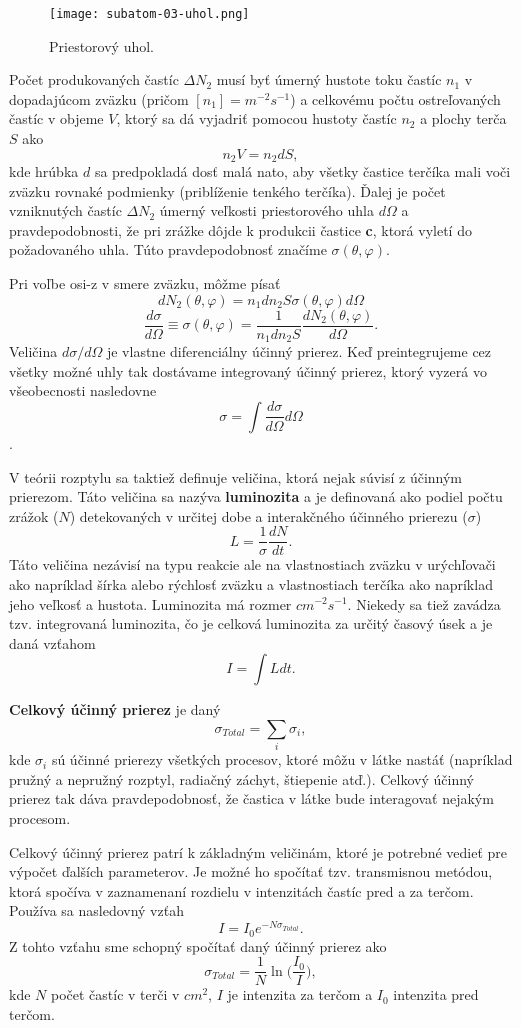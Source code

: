 \documentclass[../../main.tex]{subfiles}
\begin{document}
\begin{figure}[!h]
\texttt{[image: subatom-03-uhol.png]}
\centering
\caption{Priestorový uhol.}
\label{sf3:fig:uhol}
\end{figure}

Počet produkovaných častíc $\Delta N_2$ musí byť úmerný hustote toku častíc $n_1$ v dopadajúcom zväzku (pričom $[n_1]=m^{-2}s^{-1}$) a celkovému počtu ostreľovaných častíc v objeme $V$, ktorý sa dá vyjadriť pomocou hustoty častíc $n_2$ a plochy terča $S$ ako
$$ n_2V = n_2dS,$$
kde hrúbka $d$ sa predpokladá dosť malá nato, aby všetky častice terčíka mali voči zväzku rovnaké podmienky (priblíženie tenkého terčíka). Ďalej je počet vzniknutých častíc $\Delta N_2$ úmerný veľkosti priestorového uhla $d\Omega$ a pravdepodobnosti, že pri zrážke dôjde k produkcii častice \textbf{c}, ktorá vyletí do požadovaného uhla. Túto pravdepodobnosť značíme $\sigma(\theta, \varphi)$.

Pri voľbe osi-z v smere zväzku, môžme písať
$$ dN_2(\theta, \varphi) = n_1dn_2S \sigma(\theta, \varphi)d\Omega $$ 
$$ \frac{d\sigma}{d\Omega} \equiv \sigma(\theta, \varphi) = \frac{1}{n_1dn_2S}\frac{dN_2(\theta, \varphi)}{d\Omega}. $$
Veličina $d\sigma/d\Omega$ je vlastne diferenciálny účinný prierez. Keď preintegrujeme cez všetky možné uhly tak dostávame integrovaný účinný prierez, ktorý vyzerá vo všeobecnosti nasledovne
$$ \sigma = \int \frac{d\sigma}{d\Omega}d\Omega $$.

V teórii rozptylu sa taktiež definuje veličina, ktorá nejak súvisí z účinným prierezom. Táto veličina sa nazýva \textbf{luminozita} a je definovaná ako podiel počtu zrážok ($N$) detekovaných v určitej dobe a interakčného účinného prierezu ($\sigma$)
$$ L = \frac{1}{\sigma} \frac{dN}{dt}.$$
Táto veličina nezávisí na typu reakcie ale na vlastnostiach zväzku v urýchľovači ako napríklad šírka alebo rýchlosť zväzku a vlastnostiach terčíka ako napríklad jeho veľkosť a hustota. Luminozita má rozmer $cm^{-2}s^{-1}$. Niekedy sa tiež zavádza tzv. integrovaná luminozita, čo je celková luminozita za určitý časový úsek a je daná vzťahom 
$$ I = \int L dt.$$

\textbf{Celkový účinný prierez} je daný 
$$ \sigma_{Total} = \sum_i \sigma_i,$$
kde $\sigma_i$ sú účinné prierezy všetkých procesov, ktoré môžu v látke nastáť (napríklad pružný a nepružný rozptyl, radiačný záchyt, štiepenie atď.). Celkový účinný prierez tak dáva pravdepodobnosť, že častica v látke bude interagovať nejakým procesom.

Celkový účinný prierez patrí k základným veličinám, ktoré je potrebné vedieť pre výpočet ďalších parameterov. Je možné ho spočítať tzv. transmisnou metódou, ktorá spočíva v zaznamenaní rozdielu v intenzitách častíc pred a za terčom. Používa sa nasledovný vzťah
$$ I = I_0e^{-N\sigma_{Total}}.$$
Z tohto vzťahu sme schopný spočítať daný účinný prierez ako
$$ \sigma_{Total} = \frac{1}{N}\ln \bigg( \frac{I_0}{I} \bigg),$$
kde $N$ počet častíc v terči v $cm^2$, $I$ je intenzita za terčom a $I_0$ intenzita pred terčom.
\end{document}
